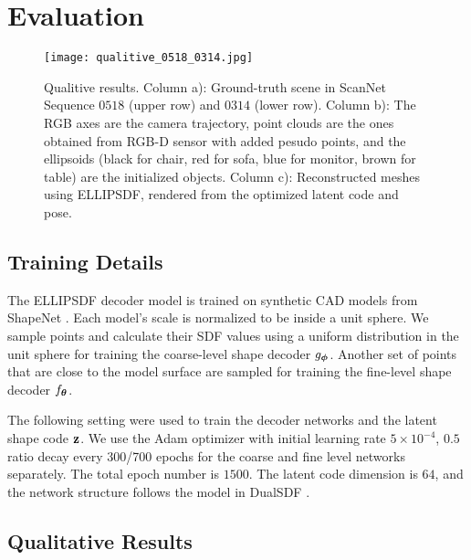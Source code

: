 \section{Evaluation}
\label{sec:evaluation}

\begin{figure*}[t]
    \centering
    \texttt{[image: qualitive\_0518\_0314.jpg]}
    \caption{Qualitive results. Column a): Ground-truth scene in ScanNet Sequence $0518$ (upper row) and $0314$ (lower row). Column b): The RGB axes are the camera trajectory, point clouds are the ones obtained from RGB-D sensor with added pesudo points, and the ellipsoids (black for chair, red for sofa, blue for monitor, brown for table) are the initialized objects. Column c): Reconstructed meshes using ELLIPSDF, rendered from the optimized latent code and pose.}
    \label{fig:qual_results}
  \end{figure*}
  

\subsection{Training Details}
\label{sec:training_details}
The ELLIPSDF decoder model is trained on synthetic CAD models from ShapeNet \cite{chang2015shapenet}. Each model's scale is normalized to be inside a unit sphere. We sample points and calculate their SDF values using a uniform distribution in the unit sphere for training the coarse-level shape decoder $g_{\boldsymbol{\phi}}$. Another set of points that are close to the model surface are sampled for training the fine-level shape decoder $f_{\boldsymbol{\theta}}$.

The following setting were used to train the decoder networks and the latent shape code $\mathbf{z}$. We use the Adam optimizer with initial learning rate $5\times 10^{-4}$,  $0.5$ ratio decay every 300/700 epochs for the coarse and fine level networks separately. 
The total epoch number is $1500$. 
The latent code dimension is $64$, and the network structure follows the model in DualSDF \cite{hao2020dualsdf}. 

\subsection{Qualitative Results}


